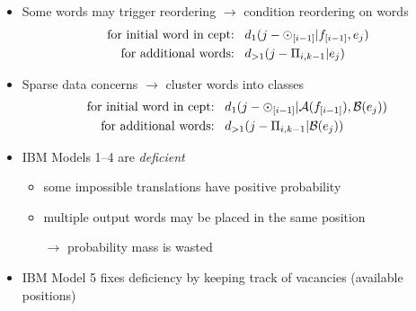 \documentclass[landscape]{slides}
\newcommand{\maths}[1]{\textcolor{purple}{#1}}
\begin{document}
\vspace{10mm}
\begin{itemize}
\item Some words may trigger reordering
$\rightarrow$ condition reordering on words
\maths{\begin{equation*}
\begin{split}
\mbox{\textcolor{black}{for initial word in cept:}}
& \; \; \; d_1(j-\odot_{[i-1]}|f_{[i-1]},e_j) \\
\mbox{\textcolor{black}{for additional words:}}
& \; \; \; d_{>1}(j-\Pi_{i,k-1}|e_j) 
\end{split}
\label{eqn:eb:model4-distortion-lex}
\end{equation*}}
\item Sparse data concerns $\rightarrow$ cluster words into classes
\maths{\begin{equation*}
\begin{split}
\mbox{\textcolor{black}{for initial word in cept:}}
& \; \; \; d_1(j-\odot_{[i-1]}|\mathcal{A}(f_{[i-1]}),\mathcal{B}(e_j)) \\
\mbox{\textcolor{black}{for additional words:}}
& \; \; \; d_{>1}(j-\Pi_{i,k-1}|\mathcal{B}(e_j)) 
\end{split}
\end{equation*}}
\end{itemize}


\vspace{20mm}
\begin{itemize}
\item IBM Models 1--4 are {\em deficient}
\begin{itemize} \itemsep 2mm
\item some impossible translations have positive probability
\item multiple output words may be placed in the same position
\item[$\rightarrow$] probability mass is wasted
\end{itemize}
\vspace{10mm}
\item IBM Model 5 fixes deficiency by keeping track of vacancies (available positions)
\end{itemize}

\end{document}
